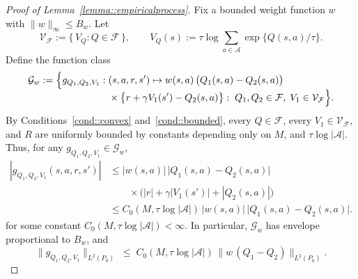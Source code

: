 \documentclass{article}
\theoremstyle{plain}
\theoremstyle{definition}
\theoremstyle{remark}
\begin{document}
\begin{proof}[Proof of Lemma~\ref{lemma::empiricalprocess}]
Fix a bounded weight function $w$ with $\|w\|_\infty \le B_w$.
Let
\[
\mathcal V_{\mathcal F}
:=
\{\,V_Q : Q\in\mathcal F\,\},
\qquad
V_Q(s):=\tau\log\sum_{a\in\mathcal A}\exp\{Q(s,a)/\tau\}.
\]
Define the function class
\begin{align*}
\mathcal{G}_w
:=
\Bigl\{
g_{Q_1,Q_2,V_1} :\;
&(s,a,r,s') \mapsto
w(s,a)\,
\bigl(Q_1(s,a) - Q_2(s,a)\bigr)
\\[-0.4em]
&\times
\bigl\{
  r
  + \gamma V_1(s')
  - Q_2(s,a)
\bigr\}
:\;
Q_1,Q_2 \in \mathcal{F},\; V_1 \in \mathcal V_{\mathcal F}
\Bigr\}.
\end{align*}
By Conditions~\ref{cond::convex} and~\ref{cond::bounded}, every
$Q \in \mathcal F$, every $V_1\in\mathcal V_{\mathcal F}$, and $R$ are
uniformly bounded by constants depending only on
\(M\), and \(\tau\log|\mathcal A|\).
Thus, for any
$g_{Q_1,Q_2,V_1} \in \mathcal{G}_w$,
\begin{align*}
|g_{Q_1,Q_2,V_1}(s,a,r,s')|
&\le
|w(s,a)|\,
\bigl|Q_1(s,a)-Q_2(s,a)\bigr|
\\
&\qquad{}\times
\bigl(|r| + \gamma|V_1(s')| + |Q_2(s,a)|\bigr)
\\[0.25em]
&\le
C_0(M,\tau\log|\mathcal A|)\,
|w(s,a)|\,\bigl|Q_1(s,a)-Q_2(s,a)\bigr|.
\end{align*}
for some constant \(C_0(M,\tau\log|\mathcal A|)<\infty\). In particular,
$\mathcal{G}_w$ has envelope proportional to \(B_w\), and
\begin{equation}
\label{eq:norm-g-vs-wdiff}
\|g_{Q_1,Q_2,V_1}\|_{L^2(P_0)}
\;\le\;
C_0(M,\tau\log|\mathcal A|)\,
\|w\,(Q_1-Q_2)\|_{L^2(P_0)}.
\end{equation}


\end{proof}
\end{document}
